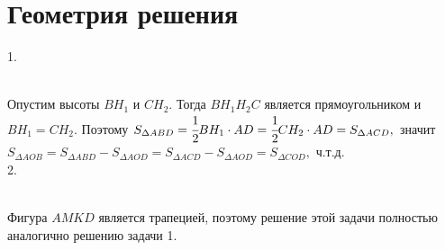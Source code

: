 \documentclass[12pt]{article}
\begin{document}
\section{Геометрия решения}
1. \begin{figure}[ht!]
\end{figure}\\
Опустим высоты $BH_1$ и $CH_2.$ Тогда $BH_1H_2C$ является прямоугольником и $BH_1=CH_2.$ Поэтому $S_{\Delta ABD}=\cfrac{1}{2}BH_1\cdot AD=\cfrac{1}{2}CH_2\cdot AD=S_{\Delta ACD},$ значит $S_{\Delta AOB}=S_{\Delta ABD}-S_{\Delta AOD}=S_{\Delta ACD}-S_{\Delta AOD}=S_{\Delta COD},$ ч.т.д.\\
2. \begin{figure}[ht!]
\end{figure}\\
Фигура $AMKD$ является трапецией, поэтому решение этой задачи полностью аналогично решению задачи 1.\\
\end{document}
